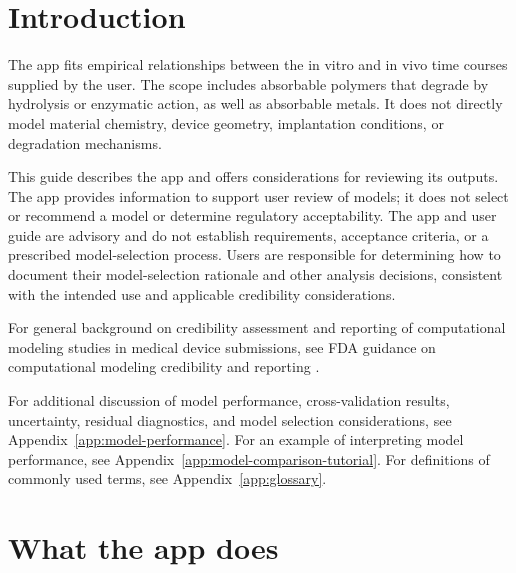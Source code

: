 
\section{Introduction}



The app fits empirical relationships between the in vitro and in vivo time courses supplied by the user. The scope includes absorbable polymers that degrade by hydrolysis or enzymatic action, as well as absorbable metals. It does not directly model material chemistry, device geometry, implantation conditions, or degradation mechanisms.

This guide describes the app and offers considerations for reviewing its outputs. The app provides information to support user review of models; it does not select or recommend a model or determine regulatory acceptability. The app and user guide are advisory and do not establish requirements, acceptance criteria, or a prescribed model-selection process. Users are responsible for determining how to document their model-selection rationale and other analysis decisions, consistent with the intended use and applicable credibility considerations.

For general background on credibility assessment and reporting of computational modeling studies in medical device submissions, see FDA guidance on computational modeling credibility and reporting \cite{fda_modeling_guidance,fda_reporting_guidance}. 

For additional discussion of model performance, cross-validation results, uncertainty, residual diagnostics, and model selection considerations, see Appendix~\ref{app:model-performance}. For an example of interpreting model performance, see Appendix~\ref{app:model-comparison-tutorial}. For definitions of commonly used terms, see Appendix~\ref{app:glossary}.

\section{What the app does}




